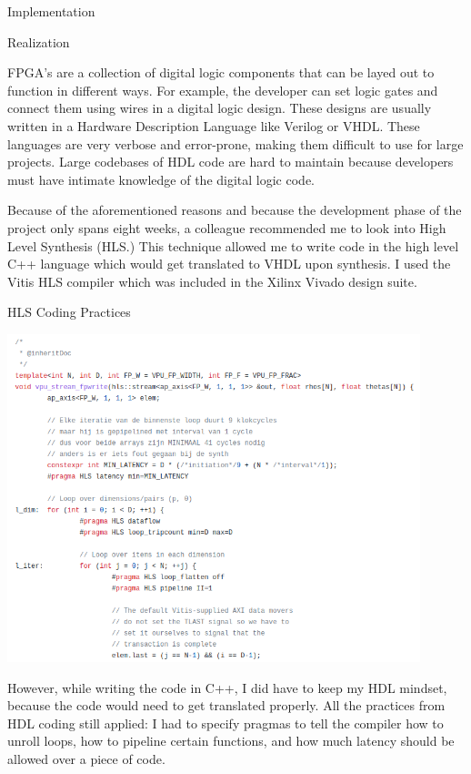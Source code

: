 \documentclass{matthijs}
\begin{document}
	\begin{hoofdstuk}{Implementation}

		\setlength\parindent{1.5em}
		\setlength{\parskip}{0.5em plus 0.2em minus 0.1em}
		\linespread{1.2}
		\vspace{-1ex}
		
		\begin{paragraaf}{Realization}

			FPGA's are a collection of digital logic components that can be layed out to function in different ways.
			For example, the developer can set logic gates and connect them using wires in a digital logic design.
			These designs are usually written in a Hardware Description Language like Verilog or VHDL.
			These languages are very verbose and error-prone, making them difficult to use for large projects.
			Large codebases of HDL code are hard to maintain because developers must have intimate knowledge of the digital logic code.
			
			Because of the aforementioned reasons and because the development phase of the project only spans eight weeks, a colleague recommended me to look into High Level Synthesis (HLS.)
			This technique allowed me to write code in the high level C++ language which would get translated to VHDL upon synthesis.
			I used the Vitis HLS compiler which was included in the Xilinx Vivado design suite.
			
			\begin{figuur}{HLS Coding Practices}
				\centerline{
					\includegraphics[width=0.9\textwidth]{hls-code.png}
				}
			\end{figuur}

			\noindent However, while writing the code in C++, I did have to keep my HDL mindset, because the code would need to get translated properly.
			All the practices from HDL coding still applied: I had to specify pragmas to tell the compiler how to unroll loops, how to pipeline certain functions, and how much latency should be allowed over a piece of code.
			

\end{paragraaf}
\end{hoofdstuk}
\end{document}
